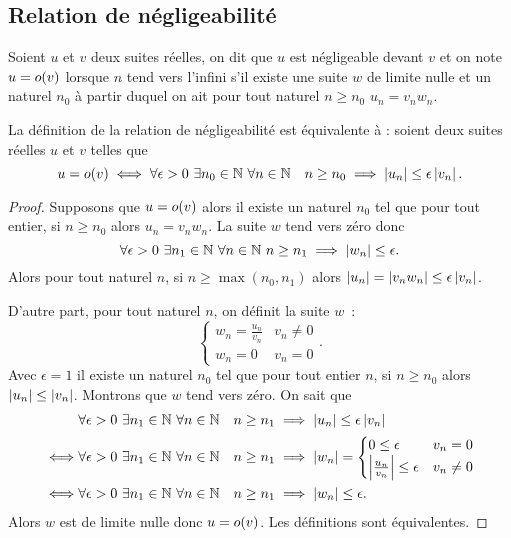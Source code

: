 \subsection{Relation de négligeabilité}

\begin{defdef}
  Soient $u$ et $v$ deux suites réelles, on dit que $u$ est négligeable devant $v$ et on note $u=o\mathopen{}\left(v\right)$ lorsque $n$ tend vers l'infini s'il existe une suite $w$ de limite nulle et un naturel $n_0$ à partir duquel on ait pour tout naturel $n \geq n_0$ $u_n = v_n w_n$.
\end{defdef}
\begin{prop}
  La définition de la relation de négligeabilité est équivalente à : soient deux suites réelles $u$ et $v$ telles que
  \begin{equation}
    u=o\mathopen{}\left(v\right) \iff \forall \epsilon > 0 \ \exists n_0 \in \mathbb{N} \ \forall n \in \mathbb{N} \quad n \geq n_0 \implies \left\lvert u_n\right\rvert \leq \epsilon \left\lvert v_n\right\rvert.
  \end{equation}
\end{prop}
\begin{proof}
  Supposons que $u=o\mathopen{}\left(v\right)$ alors il existe un naturel $n_0$ tel que pour tout entier, si $n \geq n_0$ alors $u_n = v_n w_n$. La suite $w$ tend vers zéro donc
  \begin{equation}
    \forall \epsilon > 0 \ \exists n_1 \in \mathbb{N} \ \forall n \in \mathbb{N} \ n \geq n_1 \implies \left\lvert w_n\right\rvert \leq \epsilon.
  \end{equation}
  Alors pour tout naturel $n$, si $n \geq \max(n_0, n_1)$ alors $\left\lvert u_n\right\rvert = \left\lvert v_n w_n\right\rvert \leq \epsilon \left\lvert v_n\right\rvert$.

  D'autre part, pour tout naturel $n$, on définit la suite $w$~:
  \begin{equation}
    \begin{cases} w_n=\frac{u_n}{v_n} & v_n \neq 0 \\ w_n=0 & v_n=0\end{cases}.
  \end{equation}
  Avec $\epsilon=1$ il existe un naturel $n_0$ tel que pour tout entier $n$, si $n \geq n_0$ alors $\left\lvert u_n\right\rvert \leq \left\lvert v_n\right\rvert$. Montrons que $w$ tend vers zéro. On sait que
  \begin{align}
    & \forall \epsilon > 0 \ \exists n_1 \in \mathbb{N} \ \forall n \in \mathbb{N} \quad n \geq n_1 \implies \left\lvert u_n\right\rvert \leq \epsilon \left\lvert v_n\right\rvert \\ 
    \iff & \forall \epsilon > 0 \ \exists n_1 \in \mathbb{N} \ \forall n \in \mathbb{N} \quad n \geq n_1 \implies \left\lvert w_n\right\rvert= \begin{cases} 0 \leq \epsilon & v_n=0 \\ \left\lvert\frac{u_n}{v_n}\right\rvert \leq \epsilon & v_n\neq 0 \end{cases} \\
    \iff & \forall \epsilon > 0 \ \exists n_1 \in \mathbb{N} \ \forall n \in \mathbb{N} \quad n \geq n_1 \implies \left\lvert w_n\right\rvert \leq \epsilon.
  \end{align}
  Alors $w$ est de limite nulle donc $u=o\mathopen{}\left(v\right)$. Les définitions sont équivalentes.
\end{proof}
